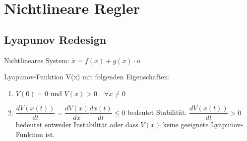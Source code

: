 
\section{Nichtlineare Regler}

\subsection{Lyapunov Redesign}

Nichtlineares System: $\dot{x} = f(x) + g(x) \cdot u$

Lyapunov-Funktion V(x) mit folgenden Eigenschaften:
\begin{enumerate}
	\item $V(0) = 0$ und $V(x) > 0 \quad \forall x \neq 0$
	\item $\dfrac{dV(x(t))}{dt}=\dfrac{dV(x)}{dx}\dfrac{dx(t)}{dt} \leq 0$ bedeutet Stabilität. $\dfrac{dV(x(t))}{dt} > 0$ bedeutet entweder Instabilität oder dass $V(x)$ keine geeignete Lyapunov-Funktion ist.
\end{enumerate}